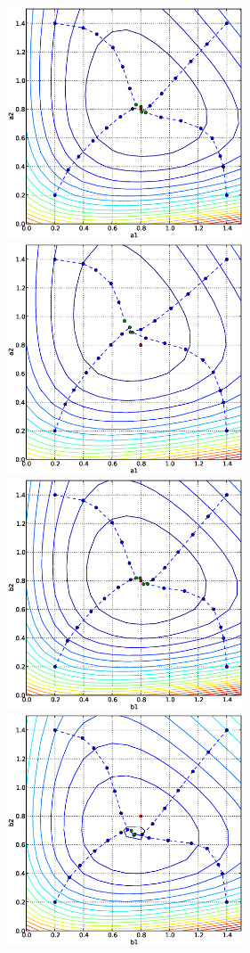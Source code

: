 \begin{figure}
  \begin{center}
    \includegraphics[width=7cm]{chapters/schroll/eps/a1a2scan4.eps}
    \includegraphics[width=7cm]{chapters/schroll/eps/a1a2scan4-5.eps}
    \includegraphics[width=7cm]{chapters/schroll/eps/b1b2scan4.eps}
    \includegraphics[width=7cm]{chapters/schroll/eps/b1b2scan4-5.eps}

\end{center}
\end{figure}
